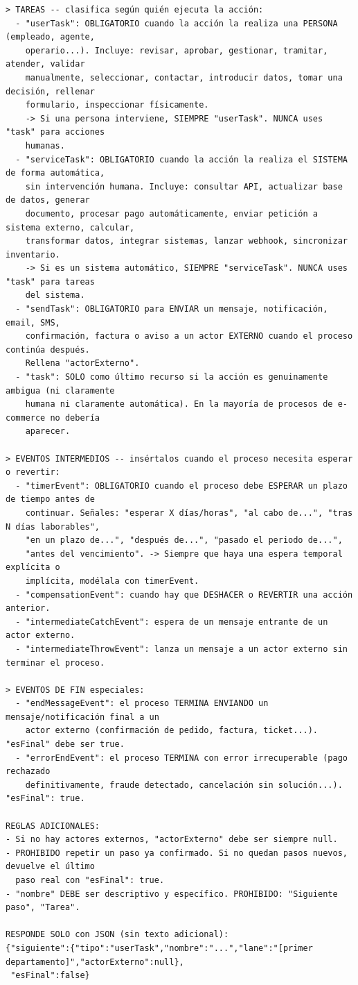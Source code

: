 \begin{lstlisting}[style=promptbox]
> TAREAS -- clasifica según quién ejecuta la acción:
  - "userTask": OBLIGATORIO cuando la acción la realiza una PERSONA (empleado, agente,
    operario...). Incluye: revisar, aprobar, gestionar, tramitar, atender, validar
    manualmente, seleccionar, contactar, introducir datos, tomar una decisión, rellenar
    formulario, inspeccionar físicamente.
    -> Si una persona interviene, SIEMPRE "userTask". NUNCA uses "task" para acciones
    humanas.
  - "serviceTask": OBLIGATORIO cuando la acción la realiza el SISTEMA de forma automática,
    sin intervención humana. Incluye: consultar API, actualizar base de datos, generar
    documento, procesar pago automáticamente, enviar petición a sistema externo, calcular,
    transformar datos, integrar sistemas, lanzar webhook, sincronizar inventario.
    -> Si es un sistema automático, SIEMPRE "serviceTask". NUNCA uses "task" para tareas
    del sistema.
  - "sendTask": OBLIGATORIO para ENVIAR un mensaje, notificación, email, SMS,
    confirmación, factura o aviso a un actor EXTERNO cuando el proceso continúa después.
    Rellena "actorExterno".
  - "task": SOLO como último recurso si la acción es genuinamente ambigua (ni claramente
    humana ni claramente automática). En la mayoría de procesos de e-commerce no debería
    aparecer.

> EVENTOS INTERMEDIOS -- insértalos cuando el proceso necesita esperar o revertir:
  - "timerEvent": OBLIGATORIO cuando el proceso debe ESPERAR un plazo de tiempo antes de
    continuar. Señales: "esperar X días/horas", "al cabo de...", "tras N días laborables",
    "en un plazo de...", "después de...", "pasado el periodo de...",
    "antes del vencimiento". -> Siempre que haya una espera temporal explícita o
    implícita, modélala con timerEvent.
  - "compensationEvent": cuando hay que DESHACER o REVERTIR una acción anterior.
  - "intermediateCatchEvent": espera de un mensaje entrante de un actor externo.
  - "intermediateThrowEvent": lanza un mensaje a un actor externo sin terminar el proceso.

> EVENTOS DE FIN especiales:
  - "endMessageEvent": el proceso TERMINA ENVIANDO un mensaje/notificación final a un
    actor externo (confirmación de pedido, factura, ticket...). "esFinal" debe ser true.
  - "errorEndEvent": el proceso TERMINA con error irrecuperable (pago rechazado
    definitivamente, fraude detectado, cancelación sin solución...). "esFinal": true.

REGLAS ADICIONALES:
- Si no hay actores externos, "actorExterno" debe ser siempre null.
- PROHIBIDO repetir un paso ya confirmado. Si no quedan pasos nuevos, devuelve el último
  paso real con "esFinal": true.
- "nombre" DEBE ser descriptivo y específico. PROHIBIDO: "Siguiente paso", "Tarea".

RESPONDE SOLO con JSON (sin texto adicional):
{"siguiente":{"tipo":"userTask","nombre":"...","lane":"[primer departamento]","actorExterno":null},
 "esFinal":false}
\end{lstlisting}

